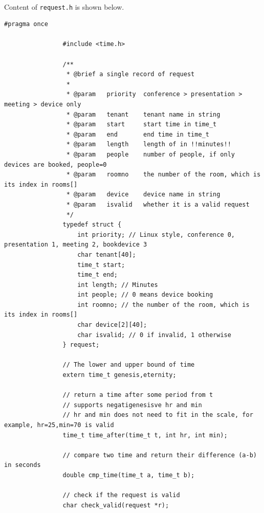 \documentclass{article}
\begin{document}
            \paragraph{}
                Content of \texttt{request.h} is shown below.
            \begin{Verbatim}[gobble=8]
                #pragma once

                #include <time.h>
                
                /**
                 * @brief a single record of request
                 * 
                 * @param   priority  conference > presentation > meeting > device only
                 * @param   tenant    tenant name in string
                 * @param   start     start time in time_t
                 * @param   end       end time in time_t
                 * @param   length    length of in !!minutes!!
                 * @param   people    number of people, if only devices are booked, people=0
                 * @param   roomno    the number of the room, which is its index in rooms[]
                 * @param   device    device name in string
                 * @param   isvalid   whether it is a valid request
                 */
                typedef struct {
                    int priority; // Linux style, conference 0, presentation 1, meeting 2, bookdevice 3
                    char tenant[40];
                    time_t start;
                    time_t end;
                    int length; // Minutes
                    int people; // 0 means device booking
                    int roomno; // the number of the room, which is its index in rooms[]
                    char device[2][40];
                    char isvalid; // 0 if invalid, 1 otherwise
                } request;
                
                // The lower and upper bound of time
                extern time_t genesis,eternity;
                
                // return a time after some period from t
                // supports negatigenesisve hr and min
                // hr and min does not need to fit in the scale, for example, hr=25,min=70 is valid
                time_t time_after(time_t t, int hr, int min);
                
                // compare two time and return their difference (a-b) in seconds
                double cmp_time(time_t a, time_t b);
                
                // check if the request is valid
                char check_valid(request *r);
            \end{Verbatim}
\end{document}

